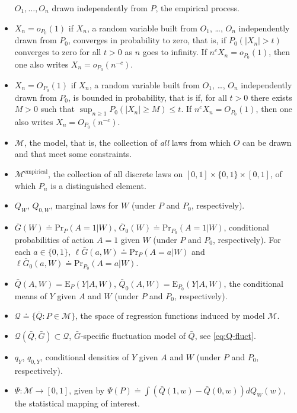 \documentclass[11pt,openright,twoside]{book}
\newcommand{\defq}{\doteq}
\newcommand{\calM}{\mathcal{M}}
\newcommand{\calQ}{\mathcal{Q}}
\newcommand{\Exp}{\textrm{E}}
\newcommand{\Gbar}{\bar{G}}
\renewcommand{\Pr}{\textrm{Pr}}
\newcommand{\Qbar}{\bar{Q}}
\theoremstyle{definition}
\theoremstyle{definition}
\theoremstyle{definition}
\theoremstyle{remark}
\begin{document}
\begin{itemize}
  \(O_{1}, \ldots, O_{n}\) drawn independently from \(P\), the empirical process.
\item
  \(X_n = o_{P_0}(1)\) if \(X_n\), a random variable built from \(O_{1}\), \ldots,
  \(O_{n}\) independently drawn from \(P_0\), converges in probability to zero, that
  is, if \(P_0(|X_n| > t)\) converges to zero for all \(t>0\) as \(n\) goes to
  infinity. If \(n^{c} X_n = o_{P_0}(1)\), then one also writes \(X_n = o_{P_0}(n^{-c})\).
\item
  \(X_{n} = O_{P_0}(1)\) if \(X_n\), a random variable built from \(O_{1}\), \ldots,
  \(O_{n}\) independently drawn from \(P_0\), is bounded in probability, that
  is if, for all \(t>0\) there exists \(M >0\) such that \(\sup_{n \geq 1} P_0(|X_n| \geq M) \leq t\). If \(n^{c} X_n = O_{P_0}(1)\), then one also writes \(X_n = O_{P_0}(n^{-c})\).
\item
  \(\calM\), the model, that is, the collection of \emph{all} laws from which \(O\)
  can be drawn and that meet some constraints.
\item
  \(\calM^{\text{empirical}}\), the collection of all discrete laws on \([0,1] \times \{0,1\} \times [0,1]\), of which \(P_{n}\) is a distinguished element.
\item
  \(Q_{W}\), \(Q_{0,W}\), marginal laws for \(W\) (under \(P\) and \(P_{0}\),
  respectively).
\item
  \(\Gbar(W) \defq \Pr_{P}(A = 1 | W)\), \(\Gbar_0(W) \defq \Pr_{P_0}(A = 1 | W)\), conditional probabilities of action \(A = 1\) given \(W\) (under \(P\) and
  \(P_{0}\), respectively). For each \(a \in \{0,1\}\), \(\ell\Gbar(a,W) \defq \Pr_{P}(A = a | W)\) and \(\ell\Gbar_0(a,W) \defq \Pr_{P_0}(A = a | W)\).
\item
  \(\Qbar(A,W) = \Exp_{P}(Y|A,W)\), \(\Qbar_0(A,W) = \Exp_{P_{0}}(Y|A,W)\), the
  conditional means of \(Y\) given \(A\) and \(W\) (under \(P\) and \(P_{0}\),
  respectively).
\item
  \(\calQ \defq \{\Qbar : P \in \calM\}\), the space of regression
  functions induced by model \(\calM\).
\item
  \(\calQ(\Qbar,\Gbar) \subset \calQ\), \(\Gbar\)-specific fluctuation model of
  \(\Qbar\), see \eqref{eq:Q-fluct}.
\item
  \(q_{Y}\), \(q_{0,Y}\), conditional densities of \(Y\) given \(A\) and \(W\) (under
  \(P\) and \(P_{0}\), respectively).
\item
  \(\Psi : \calM \to [0,1]\), given by \(\Psi(P) \defq \int \left(\Qbar(1, w) - \Qbar(0, w)\right)dQ_{W}(w)\), the statistical mapping of interest.

\end{itemize}
\end{document}
